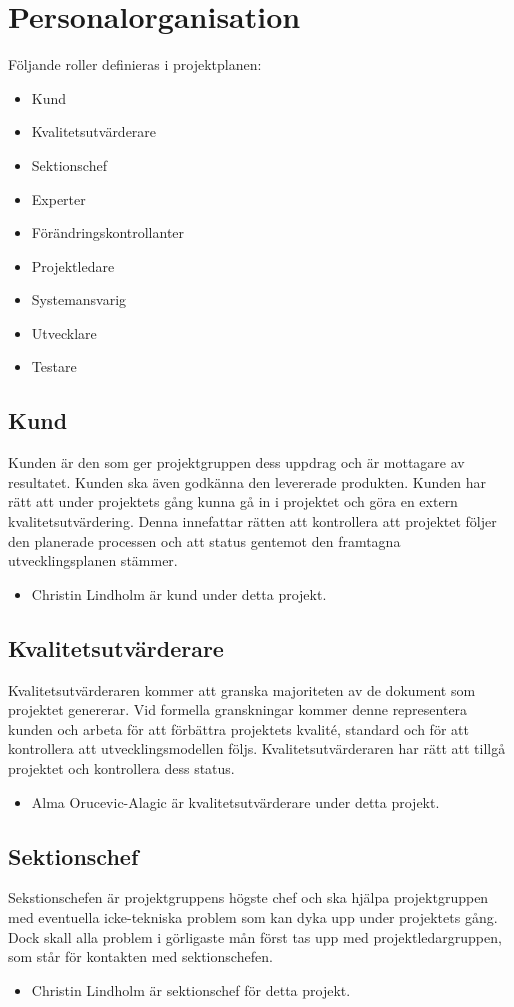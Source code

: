 \documentclass[paper=a4, fontsize=11pt,twoside]{article}
\begin{document}
\section{Personalorganisation}
Följande roller definieras i projektplanen: 
\begin{itemize}
\item Kund
\item Kvalitetsutvärderare
\item Sektionschef
\item Experter
\item Förändringskontrollanter
\item Projektledare
\item Systemansvarig
\item Utvecklare
\item Testare
\end{itemize}

\subsection*{Kund}
Kunden är den som ger projektgruppen dess uppdrag och är mottagare av resultatet. Kunden ska även godkänna den levererade produkten. Kunden har rätt att under projektets gång kunna gå in i projektet och göra en extern kvalitetsutvärdering. Denna innefattar rätten att kontrollera att projektet följer den planerade processen och att status gentemot den framtagna utvecklingsplanen stämmer. 
\begin{itemize}
\item Christin Lindholm är kund under detta projekt. 
\end{itemize}

\subsection*{Kvalitetsutvärderare}
Kvalitetsutvärderaren kommer att granska majoriteten av de dokument som projektet genererar. Vid formella granskningar kommer denne representera kunden och arbeta för att förbättra projektets kvalité, standard och för att kontrollera att utvecklingsmodellen följs. Kvalitetsutvärderaren har rätt att tillgå projektet och kontrollera dess status.
\begin{itemize}
\item Alma Orucevic-Alagic är kvalitetsutvärderare under detta projekt.
\end{itemize}

\subsection*{Sektionschef}
Sekstionschefen är projektgruppens högste chef och ska hjälpa projektgruppen med eventuella icke-tekniska problem som kan dyka upp under projektets gång. Dock skall alla problem i görligaste mån först tas upp med projektledargruppen, som står för kontakten med sektionschefen.
\begin{itemize}
\item Christin Lindholm är sektionschef för detta projekt.
\end{itemize}
		
\end{document}
